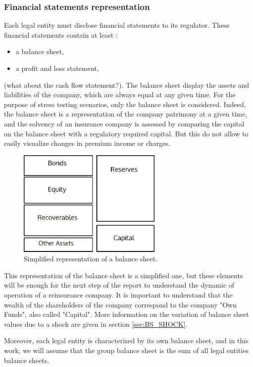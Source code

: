 \subsubsection{Financial statements representation}
\label{sec:FINANCIAL_STATEMENT}

Each legal entity must disclose financial statements to its regulator. These financial statements contain at least :
\begin{itemize}
  \item a balance sheet,
  \item a profit and loss statement,
\end{itemize}
(what about the cash flow statement?). The balance sheet display the assets and liabilities of the company, which are always equal at any given time. 
For the purpose of stress testing scenarios, only the balance sheet is considered. Indeed, the balance sheet is a representation of the company patrimony at a given time, and the solvency of an insurance company is assessed by comparing the capital on the balance sheet with a regulatory required capital. But this do not allow to easily visualize changes in premium income or charges.

\begin{figure}[h!]
\centering
  \includegraphics[width=70mm]{images/part1/balancesheet.eps}
  \caption{Simplified representation of a balance sheet.}
  \label{fig:BALANCE_SHEET}
\end{figure}


This representation of the balance sheet is a simplified one, but these elements will be enough for the next step of the report to understand the dynamic of operation of a reinsurance company. It is important to understand that the wealth of the shareholders of the company correspond to the company "Own Funds", also called "Capital". More information on the variation of balance sheet values due to a shock are given in section \ref{sec:BS_SHOCK}.

Moreover, each legal entity is characterized by its own balance sheet, and in this work, we will assume that the group balance sheet is the sum of all legal entities balance sheets.

